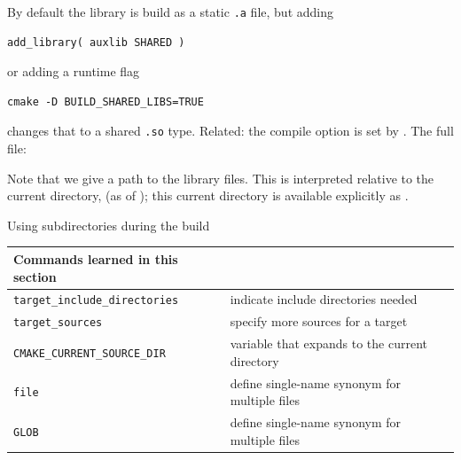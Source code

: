 By default the library is build as a static \lstinline[language=shell]{.a} file,
but adding
\begin{lstlisting}
add_library( auxlib SHARED )
\end{lstlisting}
or adding a runtime flag
\begin{lstlisting}[language=shell]
cmake -D BUILD_SHARED_LIBS=TRUE
\end{lstlisting}
changes that to a shared \lstinline[language=shell]{.so} type.
%
Related: the  compile option
is set by
.
\hfill\break
\hbox{}\hfill\break
The full  file:
%

%
Note that we give a path to the library files.
This is interpreted relative to the current directory,
(as of );
this current directory is available explicitly as .

\newpage
{} {Using subdirectories during the build}


\begin{tabular}{lp{3in}}
  \toprule
  Commands learned in this section\\
  \midrule
  \lstinline+target_include_directories+&indicate include directories needed\\
  \lstinline+target_sources+&specify more sources for a target\\
  \lstinline+CMAKE_CURRENT_SOURCE_DIR+&variable that expands to the current directory\\
  \lstinline+file+&define single-name synonym for multiple files\\
  \lstinline+GLOB+&define single-name synonym for multiple files\\
  \bottomrule
\end{tabular}

